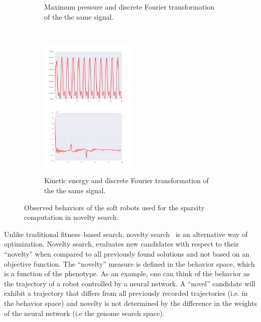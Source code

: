 \documentclass{sig-alternate}
\begin{document}
\begin{figure}[t!]
\begin{subfigure}[t]{0.23\textwidth}
\caption{Maximum pressure and discrete Fourier transformation of the the same signal.}
\end{subfigure}~
\begin{subfigure}[t]{0.23\textwidth}
\centering
\includegraphics[width=0.5\textwidth]{../Figures/Behaviors/ke.pdf}~
\includegraphics[width=0.5\textwidth]{../Figures/Behaviors/kedft.pdf}
\caption{Kinetic energy and discrete Fourier transformation of the the same signal.}
\end{subfigure}
\caption{Observed behaviors of the soft robots used for the sparsity computation in novelty search.}
\label{fig:Behaviors}
\end{figure}

Unlike traditional fitness--based search, novelty search~\cite{lehman2008exploiting,lehman2011abandoning,lehman2010revising, risi2009novelty} is an alternative way of optimization. Novelty search, evaluates new candidates with respect to their ``novelty'' when compared to all previously found solutions and not based on an objective function. The ``novelty'' measure is defined in the behavior space, which is a function of the phenotype. As an example, one can think of the behavior as the trajectory of a robot controlled by a neural network. A ``novel'' candidate will exhibit a trajectory that differs from all previously recorded trajectories (i.e. in the behavior space) and novelty is not determined by the difference in the weights of the neural network (i.e the genome search space).

\end{document}
